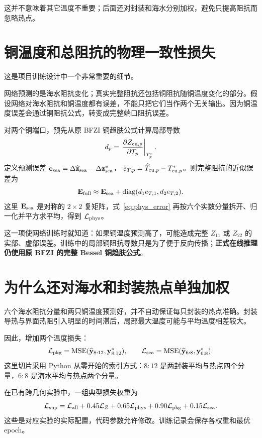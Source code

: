 这并不意味着其它温度不重要；后面还对封装和海水分别加权，避免只提高阻抗而忽略热点。

\section{铜温度和总阻抗的物理一致性损失}
\label{sec:physloss}
这是项目训练设计中一个非常重要的细节。

网络预测的是海水阻抗变化；真实完整阻抗还包括铜阻抗随铜温度变化的部分。假设网络对海水阻抗和铜温度都有误差，不能只把它们当作两个无关输出。因为铜温度误差会通过铜阻抗公式，转变成完整端口阻抗误差。

对两个铜端口，预先从原 BFZI 铜趋肤公式计算局部导数
\[
d_p=\left.\frac{\partial Z_{{\rm cu},p}}{\partial T_p}\right|_{T_p^*}.
\]
定义预测误差 $\mathbf e_{\rm sea}=\Delta\widehat{\mathbf z}_{\rm sea}-\Delta\mathbf z_{\rm sea}^*$，
$e_{T,p}=\widehat T_{{\rm cu},p}-T_{{\rm cu},p}^*$。则完整阻抗的近似误差为
\begin{equation}
\label{eq:phys_error}
\mathbf E_{\rm full}\approx
\mathbf E_{\rm sea}
+\operatorname{diag}(d_1e_{T,1},d_2e_{T,2}).
\end{equation}
这里 $\mathbf E_{\rm sea}$ 是对称的 $2\times2$ 复矩阵，式~\eqref{eq:phys_error} 再按六个实数分量拆开、归一化并平方求平均，得到 $\mathcal L_{\rm phys}$。

这一项使网络训练时就知道：如果铜温度预测高了，可能造成完整 $Z_{11}$ 或 $Z_{22}$ 的实部、虚部误差。训练中的局部铜阻抗导数只是为了便于反向传播；\textbf{正式在线推理仍使用原 BFZI 的完整 Bessel 铜趋肤公式}。

\section{为什么还对海水和封装热点单独加权}
六个海水阻抗分量和两只铜温度预测好，并不自动保证每只封装的热点准确。封装导热与界面热阻引入明显的时间滞后，局部最大温度可能与平均温度相差较大。

因此，增加两个温度损失：
\[
\mathcal L_{\rm pkg}
=\operatorname{MSE}(\widehat{\mathbf y}_{8:12},
\mathbf y_{8:12}^{*}),\qquad
\mathcal L_{\rm sea}
=\operatorname{MSE}(\widehat{\mathbf y}_{6:8},
\mathbf y_{6:8}^{*}).
\]
这里切片采用 Python 从零开始的索引方式：$8:12$ 是两封装平均与热点四个分量，$6:8$ 是海水平均与热点两个分量。

在已有跨几何实验中，一组典型损失权重为
\begin{equation}
\label{eq:loss}
\mathcal L_{\rm sup}=
\mathcal L_{\rm all}
+0.45\mathcal L_Z
+0.65\mathcal L_{\rm phys}
+0.90\mathcal L_{\rm pkg}
+0.15\mathcal L_{\rm sea}.
\end{equation}
这些是对应实验的实际配置，代码参数允许修改。训练记录会保存各权重和最优 epoch。

